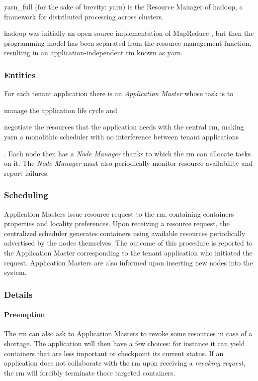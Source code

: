 \glsdesc{yarn_full} (for the sake of brevity: \glsdesc{yarn}) is the Resource Manager of \glsdesc{hadoop}, a framework for distributed processing across clusters.\par
\glsdesc{hadoop} was initially an open source implementation of MapReduce \cite{mapreduce}, but then the programming model has been separated from the resource management function, resulting in an application-independent \gls{rm} known as \glsdesc{yarn}.

\subsubsection{Entities}
For each tenant application there is an \textit{Application Master} whose task is to
\begin{mylist}
    \item manage the application life cycle and
    \item negotiate the resources that the application needs with the central \gls{rm}, making \glsdesc{yarn} a monolithic scheduler with no interference between tenant applications
\end{mylist}.
Each node then has a \textit{Node Manager} thanks to which the \gls{rm} can allocate tasks on it.
The \textit{Node Manager} must also periodically monitor resource availability and report failures.

\subsubsection{Scheduling}
Application Masters issue resource request to the \gls{rm}, containing containers properties and locality preferences.
Upon receiving a resource request, the centralized scheduler generates containers using available resources periodically advertised by the nodes themselves.
The outcome of this procedure is reported to the Application Master corresponding to the tenant application who initiated the request.
Application Masters are also informed upon inserting new nodes into the system.

\subsubsection{Details}
\paragraph{Preemption}
The \gls{rm} can also ask to Application Masters to revoke some resources in case of a shortage.
The application will then have a few choices: for instance it can yield containers that are less important or checkpoint its current status.
If an application does not collaborate with the \gls{rm} upon receiving a \textit{revoking request}, the \gls{rm} will forcibly terminate those targeted containers.
